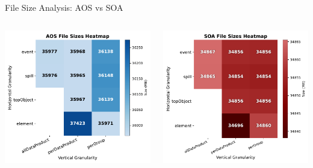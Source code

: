 \documentclass[aspectratio=169]{beamer}
\begin{document}
\begin{frame}{File Size Analysis: AOS vs SOA}
  \begin{columns}[T,onlytextwidth]
    \centering
    \includegraphics[width=\linewidth]{../experiments/Seaborn/AOS_FileSize_Heatmap_softblue_nogrid.pdf}

    \centering
    \includegraphics[width=\linewidth]{../experiments/Seaborn/SOA_FileSize_Heatmap_merun_white.pdf}
  \end{columns}
\end{frame}
\end{document}
